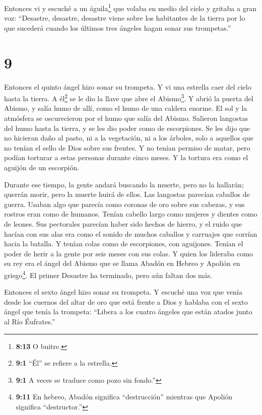  Entonces vi y escuché a un águila\footnote{\textbf{8:13} O
  buitre.} que volaba en medio del cielo y gritaba a gran voz:
``Desastre, desastre, desastre viene sobre los habitantes de la tierra
por lo que sucederá cuando los últimos tres ángeles hagan sonar sus
trompetas.''

\hypertarget{section-8}{%
\section{9}\label{section-8}}

 Entonces el quinto ángel hizo sonar su trompeta. Y vi una
estrella caer del cielo hasta la tierra. A él\footnote{\textbf{9:1}
  ``Él'' se refiere a la estrella.} se le dio la llave que abre el
Abismo\footnote{\textbf{9:1} A veces se traduce como pozo sin fondo.''}.
 Y abrió la puerta del Abismo, y salía humo de allí, como el
humo de una caldera enorme. El sol y la atmósfera se oscurecieron por el
humo que salía del Abismo.  Salieron langostas del humo
hasta la tierra, y se les dio poder como de escorpiones.  Se
les dijo que no hicieran daño al pasto, ni a la vegetación, ni a los
árboles, solo a aquellos que no tenían el sello de Dios sobre sus
frentes.  Y no tenían permiso de matar, pero podían torturar
a estas personas durante cinco meses. Y la tortura era como el aguijón
de un escorpión.

 Durante ese tiempo, la gente andará buscando la muerte,
pero no la hallarán; querrán morir, pero la muerte huirá de ellos.
 Las langostas parecían caballos de guerra. Usaban algo que
parecía como coronas de oro sobre sus cabezas, y sus rostros eran como
de humanos.  Tenían cabello largo como mujeres y dientes
como de leones.  Sus pectorales parecían haber sido hechos
de hierro, y el ruido que hacían con sus alas era como el sonido de
muchos caballos y carruajes que corrían hacia la batalla. 
Y tenían colas como de escorpiones, con aguijones. Tenían el poder de
herir a la gente por seis meses con sus colas.  Y quien los
lideraba como su rey era el ángel del Abismo que se llama Abadón en
Hebreo y Apolión en griego\footnote{\textbf{9:11} En hebreo, Abadón
  significa ``destrucción'' mientras que Apolión significa
  ``destructor.''}.  El primer Desastre ha terminado, pero
aún faltan dos más.

 Entonces el sexto ángel hizo sonar su trompeta. Y escuché
una voz que venía desde los cuernos del altar de oro que está frente a
Dios  y hablaba con el sexto ángel que tenía la trompeta:
``Libera a los cuatro ángeles que están atados junto al Río Éufrates.''

